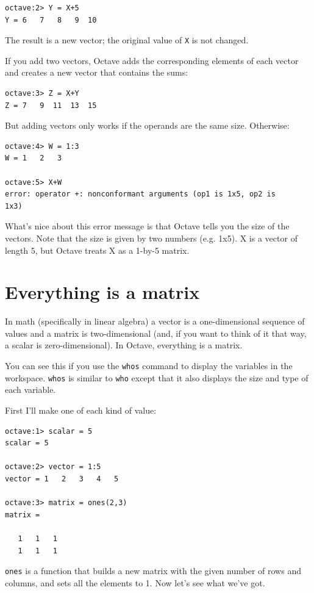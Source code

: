 \documentclass{book}
\begin{document}
\begin{verbatim}
octave:2> Y = X+5
Y = 6   7   8   9  10
\end{verbatim}

The result is a new vector; the original value of {\tt X} is not
changed.

If you add two vectors, Octave adds the corresponding elements of each
vector and creates a new vector that contains the sums:

\begin{verbatim}
octave:3> Z = X+Y
Z = 7   9  11  13  15
\end{verbatim}

But adding vectors only works if the operands are the same size.
Otherwise:

\begin{verbatim}
octave:4> W = 1:3
W = 1   2   3

octave:5> X+W
error: operator +: nonconformant arguments (op1 is 1x5, op2 is 
1x3)
\end{verbatim}

What's nice about this error message is that Octave tells you the size of
the vectors. Note that the size is given by two numbers (e.g. 1x5). X is a
vector of length 5, but Octave treats X as a 1-by-5 matrix.


\section{Everything is a matrix}

In math (specifically in linear algebra) a vector is a one-dimensional
sequence of values and a matrix is two-dimensional (and, if you want
to think of it that way, a scalar is zero-dimensional). In Octave,
everything is a matrix.

You can see this if you use the {\tt whos} command to display the
variables in the workspace. {\tt whos} is similar to {\tt who} except
that it also displays the size and type of each variable.

First I'll make one of each kind of value:

\begin{verbatim}
octave:1> scalar = 5
scalar = 5

octave:2> vector = 1:5
vector = 1   2   3   4   5

octave:3> matrix = ones(2,3)
matrix =

   1   1   1
   1   1   1
\end{verbatim}

{\tt ones} is a function that builds a new matrix with the given
number of rows and columns, and sets all the elements to 1.
Now let's see what we've got.
\end{document}
